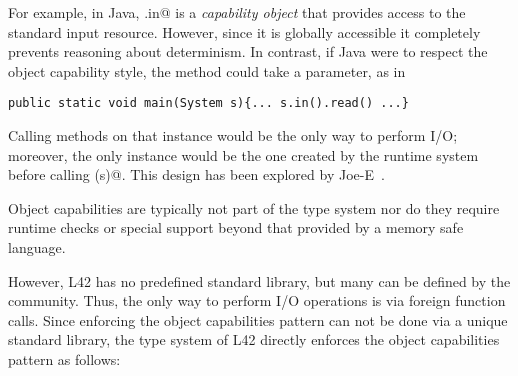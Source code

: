 
\lstset{language=Java}
 For example, in Java, \Q@System.in@%
 \lstset{language=FortyThree}
 is a \emph{capability object} that provides access to the standard input resource. However, since it is globally accessible it completely prevents reasoning about determinism. 
In contrast, if Java were to respect the object capability style, the \Q@main@ method could take a \Q@System@ parameter, as in
\lstset{language=Java}
\begin{lstlisting}
public static void main(System s){... s.in().read() ...}
\end{lstlisting}
\lstset{language=FortyThree}
Calling methods on that \Q@System@ instance would be the only way to perform I/O;
moreover, the only \Q@System@ instance would be the one created by the runtime system before calling \Q@main(s)@. %
This design has been explored by Joe-E~\cite{finifter2008verifiable}.


Object capabilities are typically not part of the type system nor do they require runtime checks or special support beyond that provided by a memory safe language. 

However, L42 has no predefined standard library, but many can be defined by the community.
Thus, the only way to perform I/O operations is via foreign function calls.
Since enforcing the object capabilities pattern can not be done via a unique standard library, the type system of L42 directly enforces the object capabilities pattern as follows:


